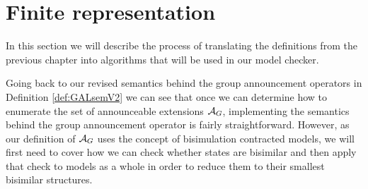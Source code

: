 \section{Finite representation}\label{sec:algorithms}

In this section we will describe the process of translating the definitions from the previous chapter into algorithms that will be used in our model checker. 


Going back to our revised semantics behind the group announcement operators in Definition \ref{def:GALsemV2} we can see that once we can determine how to enumerate the set of announceable extensions $\mathcal{A}_{G}$, implementing the semantics behind the group announcement operator is fairly straightforward. However, as our definition of $\mathcal{A}_{G}$ uses the concept of bisimulation contracted models, we will first need to cover how we can check whether states are bisimilar and then apply that check to models as a whole in order to reduce them to their smallest bisimilar structures. 


